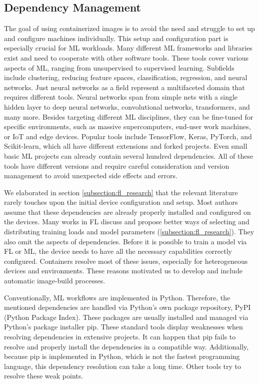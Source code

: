 \subsection{Dependency Management}

The goal of using containerized images is to avoid the need and struggle to set up and configure machines individually.
This setup and configuration part is especially crucial for ML workloads.
Many different ML frameworks and libraries exist and need to cooperate with other software tools.
These tools cover various aspects of ML, ranging from unsupervised to supervised learning.
Subfields include clustering, reducing feature spaces, classification, regression, and neural networks.
Just neural networks as a field represent a multifaceted domain that requires different tools.
Neural networks span from simple nets with a single hidden layer to deep neural networks, convolutional networks, transformers, and many more.
Besides targeting different ML disciplines, they can be fine-tuned for specific environments, such as massive supercomputers, end-user work machines, or IoT and edge devices.
Popular tools include TensorFlow, Keras, PyTorch, and Scikit-learn, which all have different extensions and forked projects.
Even small basic ML projects can already contain several hundred dependencies.
All of these tools have different versions and require careful consideration and version management to avoid unexpected side effects and errors.

We elaborated in section \ref{subsection:fl_research} that the relevant literature rarely touches upon the initial device configuration and setup.
Most authors assume that these dependencies are already properly installed and configured on the devices.
Many works in FL discuss and propose better ways of selecting and distributing training loads and model parameters (\ref{subsection:fl_research}).
They also omit the aspects of dependencies.
Before it is possible to train a model via FL or ML, the device needs to have all the necessary capabilities correctly configured.
Containers resolve most of these issues, especially for heterogeneous devices and environments.
These reasons motivated us to develop and include automatic image-build processes.

Conventionally, ML workflows are implemented in Python.
Therefore, the mentioned dependencies are handled via Python's own package repository, PyPI (Python Package Index).
These packages are usually installed and managed via Python's package installer pip.
These standard tools display weaknesses when resolving dependencies in extensive projects.
It can happen that pip fails to resolve and properly install the dependencies in a compatible way.
Additionally, because pip is implemented in Python, which is not the fastest programming language, this dependency resolution can take a long time.
Other tools try to resolve these weak points.

